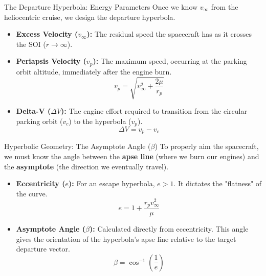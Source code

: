 \documentclass[11pt]{beamer}
\begin{document}
\begin{frame}{The Departure Hyperbola: Energy Parameters}
    Once we know $v_\infty$ from the heliocentric cruise, we design the departure hyperbola.
    
    \vspace{0.3cm}
    \begin{itemize}
        \item \textbf{Excess Velocity ($v_\infty$):} The residual speed the spacecraft has as it crosses the SOI ($r \to \infty$).
        \item \textbf{Periapsis Velocity ($v_p$):} The maximum speed, occurring at the parking orbit altitude, immediately after the engine burn.
        \begin{equation}
            v_p = \sqrt{v_\infty^2 + \frac{2\mu}{r_p}}
        \end{equation}
        \item \textbf{Delta-V ($\Delta V$):} The engine effort required to transition from the circular parking orbit ($v_c$) to the hyperbola ($v_p$).
        \begin{equation}
            \Delta V = v_p - v_c
        \end{equation}
    \end{itemize}
\end{frame}

\begin{frame}{Hyperbolic Geometry: The Asymptote Angle ($\beta$)}
    To properly aim the spacecraft, we must know the angle between the \textbf{apse line} (where we burn our engines) and the \textbf{asymptote} (the direction we eventually travel). 
    
    \vspace{0.3cm}
    \begin{itemize}
        \item \textbf{Eccentricity ($e$):} For an escape hyperbola, $e > 1$. It dictates the "flatness" of the curve.
        \begin{equation}
            e = 1 + \frac{r_p v_\infty^2}{\mu}
        \end{equation}
        \item \textbf{Asymptote Angle ($\beta$):} Calculated directly from eccentricity. This angle gives the orientation of the hyperbola's apse line relative to the target departure vector.
        \begin{equation}
            \beta = \cos^{-1}\left(\frac{1}{e}\right)
        \end{equation}
    \end{itemize}
\end{frame}
\end{document}
